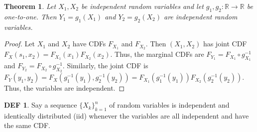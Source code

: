 \documentclass{article}
\newtheorem{theorem}{Theorem}
\theoremstyle{definition}\newtheorem{definition}{DEF}
\theoremstyle{lemma}\newtheorem{lemma}{Lemma}
\theoremstyle{corrolary}\newtheorem{corrolary}{Cor}
\begin{document}
\begin{theorem}\label{independent_functions}
Let $X_1, X_2$ be independent random variables and let $g_1, g_2:\mathbb{R}\rightarrow \mathbb{R}$ be one-to-one.
Then $Y_1=g_1(X_1)$ and $Y_2=g_2(X_2)$ are independent random variables.
\end{theorem}
\begin{proof}
Let $X_1$ and $X_2$ have CDFs $F_{X_1}$ and $F_{X_2}$.
Then $(X_1,X_2)$ has joint CDF $F_X(s_1, x_2)=F_{X_1}(x_1)F_{X_2}(x_2)$.
Thus, the marginal CDFs are $F_{Y_1}=F_{X_1}\circ g^{-1}_{X_1}$ and $F_{Y_2}=F_{X_2}\circ g^{-1}_{X_2}$.
Similarly, the joint CDF is $F_Y(y_1, y_2)=F_X(g^{-1}_1(y_1),g_2^{-1}(y_2))=F_{X_1}(g^{-1}_1(y_1))F_{X_2}(g_2^{-1}(y_2))$.
Thus, the variables are independent.
\end{proof}

\begin{definition}
Say a sequence $\{X_k\}_{k=1}^n$ of random variables is independent and identically distributed (iid) whenever the variables are all independent and have the same CDF.
\end{definition}
\end{document}
